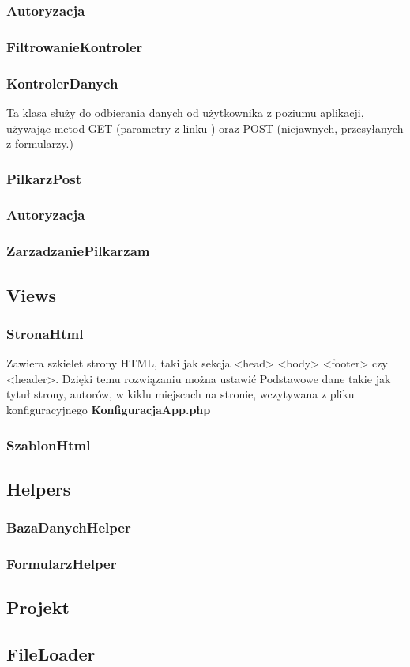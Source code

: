         \subsubsection{Autoryzacja}
        \subsubsection{FiltrowanieKontroler}
        \subsubsection{KontrolerDanych}
            Ta klasa służy do odbierania danych od użytkownika z poziumu aplikacji, używając metod GET (parametry z linku ) oraz POST (niejawnych, przesyłanych z formularzy.)
        \subsubsection{PilkarzPost}
        \subsubsection{Autoryzacja}
        \subsubsection{ZarzadzaniePilkarzam}

    \subsection{Views}
        \subsubsection{StronaHtml}
        Zawiera szkielet strony HTML, taki jak sekcja <head> <body> <footer> czy <header>. Dzięki temu rozwiązaniu można ustawić Podstawowe dane takie jak tytuł strony, autorów, w kiklu miejscach na stronie, wczytywana z pliku konfiguracyjnego \textbf{KonfiguracjaApp.php}
        \subsubsection{SzablonHtml}

    \subsection{Helpers}
        \subsubsection{BazaDanychHelper}
        \subsubsection{FormularzHelper}
        
    \subsection{Projekt}
          

    \subsection{FileLoader}